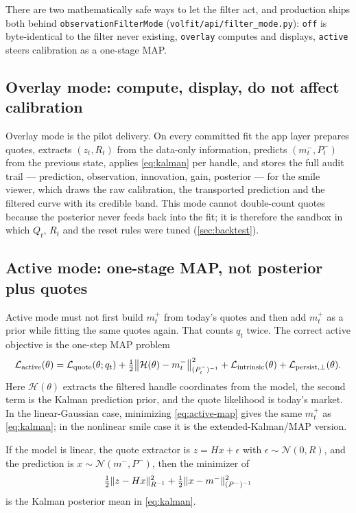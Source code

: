 \documentclass[11pt]{article}
\newcommand{\calL}{\mathcal L}
\newcommand{\calH}{\mathcal H}
\begin{document}
There are two mathematically safe ways to let the filter act, and production
ships both behind \texttt{observationFilterMode}
(\texttt{volfit/api/filter\_mode.py}): \texttt{off} is byte-identical to the
filter never existing, \texttt{overlay} computes and displays, \texttt{active}
steers calibration as a one-stage MAP.

\subsection{Overlay mode: compute, display, do not affect calibration}

Overlay mode is the pilot delivery. On every committed fit the app layer
prepares quotes, extracts $(z_t,R_t)$ from the data-only information, predicts
$(m_t^-,P_t^-)$ from the previous state, applies \cref{eq:kalman} per handle,
and stores the full audit trail --- prediction, observation, innovation, gain,
posterior --- for the smile viewer, which draws the raw calibration, the
transported prediction and the filtered curve with its credible band. This
mode cannot double-count quotes because the posterior never feeds back into
the fit; it is therefore the sandbox in which $Q_t$, $R_t$ and the reset rules
were tuned (\cref{sec:backtest}).

\subsection{Active mode: one-stage MAP, not posterior plus quotes}
\label{sec:active}

Active mode must not first build $m_t^+$ from today's quotes and then add
$m_t^+$ as a prior while fitting the same quotes again. That counts $q_t$
twice. The correct active objective is the one-step MAP problem
\begin{equation}
\calL_{\mathrm{active}}(\theta)
=\calL_{\mathrm{quote}}(\theta;q_t)
+\half\norm[\big]{\calH(\theta)-m_t^-}_{(P_t^-)^{-1}}^2
+\calL_{\mathrm{intrinsic}}(\theta)
+\calL_{\mathrm{persist},\perp}(\theta).
\label{eq:active-map}
\end{equation}
Here $\calH(\theta)$ extracts the filtered handle coordinates from the model,
the second term is the Kalman prediction prior, and the quote likelihood is
today's market. In the linear-Gaussian case, minimizing \cref{eq:active-map}
gives the same $m_t^+$ as \cref{eq:kalman}; in the nonlinear smile case it is
the extended-Kalman/MAP version.

\begin{proposition}
\label{prop:nodouble}
If the model is linear, the quote extractor is $z=H x+\epsilon$ with
$\epsilon\sim\mathcal N(0,R)$, and the prediction is
$x\sim\mathcal N(m^-,P^-)$, then the minimizer of
\[
\tfrac12\lVert z-Hx\rVert_{R^{-1}}^2+\tfrac12\lVert x-m^-\rVert_{(P^-)^{-1}}^2
\]
is the Kalman posterior mean in \cref{eq:kalman}.
\end{proposition}
\end{document}
